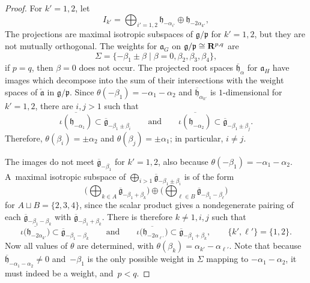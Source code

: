 \documentclass[pdftex]{sigma}
\numberwithin{equation}{section}
\theoremstyle{definition}
\newcommand{\BR}{{\bf R}}
\newcommand{\lieg}{\mathfrak{g}}
\newcommand{\lieh}{\mathfrak{h}}
\def\p{{\mathfrak p}}
\def\a{{\mathfrak a}}
\begin{document}
\begin{proof}
For $k'=1,2$, let
\[I_{k'} = \bigoplus_{i'=1,2} \lieh_{- \alpha_{i'}} \oplus \lieh_{- 2 \alpha_{k'}}, \]
The projections  are maximal isotropic subspaces of $\lieg/\p$ for $k'=1,2$, but they are not mutually orthogonal.
 The weights for $\a_G$ on $\lieg/\p \cong \BR^{p,q}$ are
\[\Sigma = \{ - \beta_1 \pm \beta \mid \beta = 0, \beta_2, \beta_3, \beta_4 \},\]
if $p=q$, then $\beta=0$ does not occur.
The projected root spaces $\overline{\lieh}_\alpha$ for $\a_H$ have images \smash{$\overline{\iota(\lieh_{\alpha})}$} which decompose into the sum of their intersections with the weight spaces of $\check{\a}$ in $\lieg/\p$.
Since $\theta(- \beta_1) = - \alpha_1 - \alpha_2$ and $\overline{\lieh}_{\alpha_{k'}}$ is $1$-dimensional for $k'=1,2$, there are $i,j > 1$ such that
\[ \overline{\iota(\lieh_{-\alpha_1})} \subset \overline{\lieg}_{- \beta_1 \pm \beta_i} \qquad \mbox{and} \qquad \overline{\iota(\lieh_{-\alpha_2})} \subset \overline{\lieg}_{- \beta_1 \pm \beta_j}.\]
Therefore, $\theta(\beta_i) = \pm \alpha_2$ and $\theta(\beta_j) = \pm \alpha_1$; in particular, $i \neq j$.

The images \smash{$\overline{\iota\bigl(\lieh_{- 2 \alpha_{k'}}\bigr)}$} do not meet $\overline{\lieg}_{- \beta_1}$ for $k'=1,2$, also because $\theta(- \beta_1) = - \alpha_1 - \alpha_2$.
A~maximal isotropic subspace of
 $ \bigoplus_{i > 1} \overline{\lieg}_{- \beta_1 \pm \beta_i}$ is of the form
 \begin{equation*}
 \biggl( \bigoplus_{k \in A} \overline{\lieg}_{- \beta_1 + \beta_k} \biggr) \oplus \biggl( \bigoplus_{\ell \in B} \overline{\lieg}_{- \beta_1 - \beta_\ell} \biggr)
\end{equation*}
 for $A \sqcup B = \{ 2, 3,4 \}$, since the scalar product gives a nondegenerate pairing of each $\overline{\lieg}_{- \beta_1 - \beta_k}$ with $\overline{\lieg}_{- \beta_1 + \beta_k}$. There is therefore $k \neq 1, i, j$ such that
 \[ \overline{\iota\bigl(\lieh_{- 2 \alpha_{k'}}\bigr)} \subset \overline{\lieg}_{- \beta_1 - \beta_k} \qquad \mbox{and} \qquad \overline{\iota\bigl(\lieh_{- 2 \alpha_{\ell'}}\bigr)} \subset \overline{\lieg}_{- \beta_1 + \beta_k}, \qquad \bigl\{ k', \ell' \bigr\} = \{ 1,2 \}.\]
 Now all values of $\theta$ are determined, with $\theta(\beta_k) = \alpha_{k'} - \alpha_{\ell'}$.
Note that because $\overline{\lieh}_{- \alpha_1 - \alpha_2} \neq 0$ and~$- \beta_1$ is the only possible weight in $\Sigma$ mapping to $- \alpha_1 - \alpha_2$, it must indeed be a weight, and~${p < q}$.


\end{proof}
\end{document}
